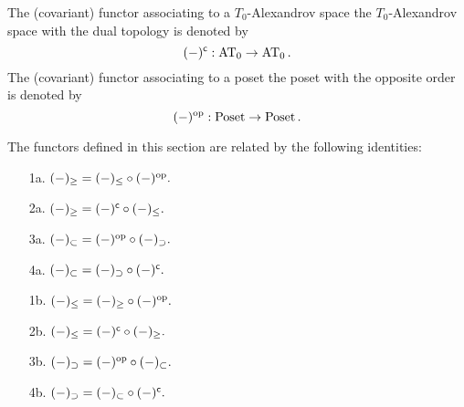 \documentclass[thesis.tex]{subfiles}
\begin{document}
\begin{definition}
The (covariant) functor associating to a $T_0$-Alexandrov space the $T_0$-Alexandrov space with the dual topology is denoted by
$$(-)^\c:\AT_0\to\AT_0.$$
The (covariant) functor associating to a poset the poset with the opposite order is denoted by
$$(-)^{\mathrm{op}}:\operatorname{Poset}\to\operatorname{Poset}.$$
\end{definition}

\begin{lemma} \label{Alexandorv spaces, posets and their dualities}
The functors defined in this section are related by the following identities:\vspace*{5pt}\par
\begin{minipage}[l]{7cm}
\begin{enumerate}
\item[1a.] $(-)_\geq=(-)_\leq\circ(-)^{\mathrm{op}}.$
\item[2a.] $(-)_\geq=(-)^{\mathsf{c}}\circ(-)_\leq.$
\item[3a.] $(-)_\subset=(-)^{\mathrm{op}}\circ(-)_\supset.$
\item[4a.] $(-)_\subset=(-)_\supset\circ(-)^{\mathsf{c}}.$
\end{enumerate}
\end{minipage}
\begin{minipage}{5cm}
\begin{enumerate}
\item[1b.] $(-)_\leq=(-)_\geq\circ(-)^{\mathrm{op}}.$
\item[2b.] $(-)_\leq=(-)^{\mathsf{c}}\circ(-)_\geq.$
\item[3b.] $(-)_\supset=(-)^{\mathrm{op}}\circ(-)_\subset.$
\item[4b.] $(-)_\supset=(-)_\subset\circ(-)^{\mathsf{c}}.$
\end{enumerate}

\end{minipage}


\end{lemma}
\end{document}
